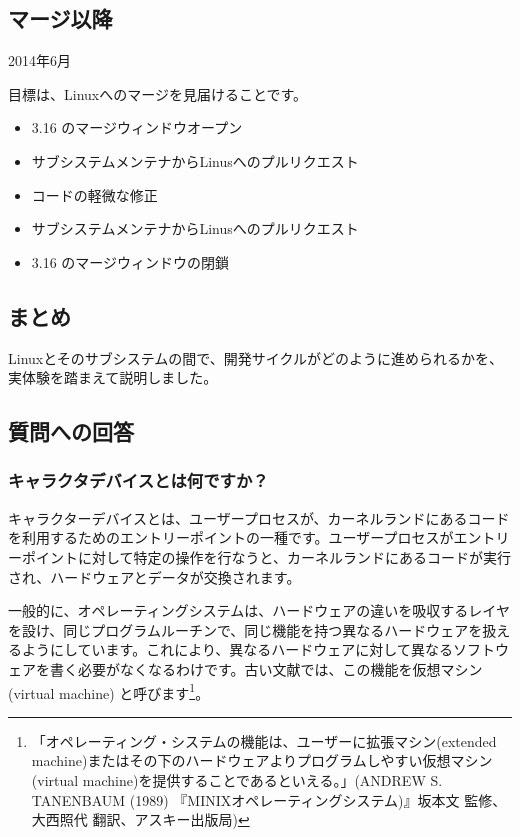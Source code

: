 \documentclass[mingoth,a4paper]{jsarticle}
\begin{document}
\subsection{マージ以降}

2014年6月

目標は、Linuxへのマージを見届けることです。

\begin{itemize}
\itemsep1pt\parskip0pt
\item
  3.16 のマージウィンドウオープン
\item
  サブシステムメンテナからLinusへのプルリクエスト
\item
  コードの軽微な修正
\item
  サブシステムメンテナからLinusへのプルリクエスト
\item
  3.16 のマージウィンドウの閉鎖
\end{itemize}

\subsection{まとめ}

Linuxとそのサブシステムの間で、開発サイクルがどのように進められるかを、実体験を踏まえて説明しました。

\subsection{質問への回答}

\subsubsection{キャラクタデバイスとは何ですか？}

キャラクターデバイスとは、ユーザープロセスが、カーネルランドにあるコードを利用するためのエントリーポイントの一種です。ユーザープロセスがエントリーポイントに対して特定の操作を行なうと、カーネルランドにあるコードが実行され、ハードウェアとデータが交換されます。

一般的に、オペレーティングシステムは、ハードウェアの違いを吸収するレイヤを設け、同じプログラムルーチンで、同じ機能を持つ異なるハードウェアを扱えるようにしています。これにより、異なるハードウェアに対して異なるソフトウェアを書く必要がなくなるわけです。古い文献では、この機能を仮想マシン (virtual machine) と呼びます\footnote{「オペレーティング・システムの機能は、ユーザーに拡張マシン(extended machine)またはその下のハードウェアよりプログラムしやすい仮想マシン(virtual machine)を提供することであるといえる。」(ANDREW S. TANENBAUM (1989) 『MINIXオペレーティングシステム)』坂本文 監修、大西照代 翻訳、アスキー出版局)}。
\end{document}
